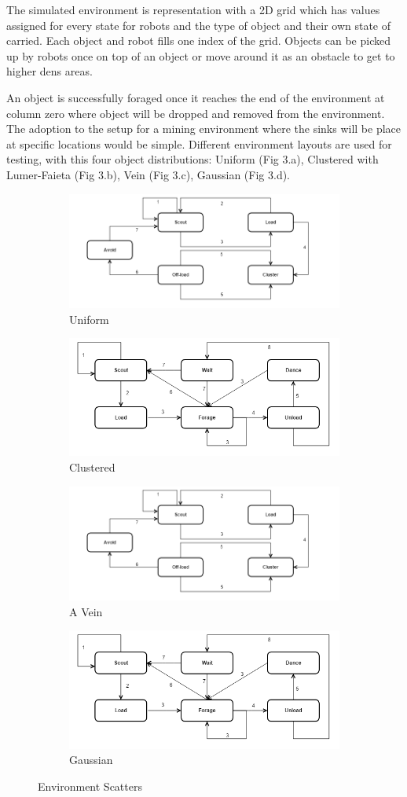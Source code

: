 \documentclass[12pt]{article}
\begin{document}
\par{The simulated environment is representation with a 2D grid which has values assigned for every state for robots and the type of object and their own state of carried. Each object and robot fills one index of the grid. Objects can be picked up by robots once on top of an object or move around it as an obstacle to get to higher dens areas.}
\\
\par{An object is successfully foraged once it reaches the end of the environment at column zero where object will be dropped and removed from the environment. The adoption to the setup for a mining environment where the sinks will be place at specific locations would be simple. Different environment layouts are used for testing, with this four object distributions: Uniform (Fig 3.a), Clustered with Lumer-Faieta (Fig 3.b), Vein (Fig 3.c), Gaussian (Fig 3.d).}
\\
\begin{figure}[h]
\centering
\begin{subfigure}{0.2\textwidth}
  \centering
  \includegraphics[width=.2\linewidth]{desertant.png}
  \caption{Uniform}
  \label{fig:sub1}
\end{subfigure}%
\begin{subfigure}{.2\textwidth}
  \centering
  \includegraphics[width=.2\linewidth]{honeybee.png}
  \caption{Clustered}
  \label{fig:sub2}
\end{subfigure}
\begin{subfigure}{.2\textwidth}
  \centering
  \includegraphics[width=.2\linewidth]{desertant.png}
  \caption{A Vein}
  \label{fig:sub3}
\end{subfigure}%
\begin{subfigure}{.2\textwidth}
  \centering
  \includegraphics[width=.2\linewidth]{honeybee.png}
  \caption{Gaussian}
  \label{fig:sub4}
\end{subfigure}
\caption{Environment Scatters}
\label{fig:EnvironmentScaters}
\end{figure}
\end{document}
